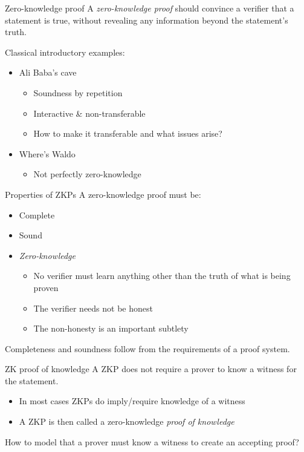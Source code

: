 \begin{frame}{Zero-knowledge proof}
  A \emph{zero-knowledge proof} should convince a verifier that a statement is true, without revealing any information beyond the statement's truth.

  \vspace*{1em}

  \pause
  Classical introductory examples:
  \begin{itemize}[<+(1)->]
    \item Ali Baba's cave
    \begin{itemize}
      \item Soundness by repetition
      \item Interactive \& non-transferable
      \item How to make it transferable and what issues arise?
    \end{itemize}
    \item Where's Waldo
    \begin{itemize}
      \item Not perfectly zero-knowledge
    \end{itemize}
  \end{itemize}
\end{frame}

\begin{frame}{Properties of ZKPs}
  A zero-knowledge proof must be:
  \begin{itemize}[<+(1)->]
    \item Complete
    \item Sound
    \item \emph{Zero-knowledge}
    \begin{itemize}
      \item No verifier must learn anything other than the truth of what is being proven
      \item The verifier needs not be honest
      \item The non-honesty is an important subtlety
    \end{itemize}
  \end{itemize}

  \pause
  Completeness and soundness follow from the requirements of a proof system.
\end{frame}

\begin{frame}{ZK proof of knowledge}
  A ZKP does not require a prover to know a witness for the statement.
  \begin{itemize}[<+(1)->]
    \item In most cases ZKPs do imply/require knowledge of a witness
    \item A ZKP is then called a zero-knowledge \emph{proof of knowledge}
  \end{itemize}

  \vspace*{1em}

  \pause
  How to model that a prover must know a witness to create an accepting proof?
\end{frame}


